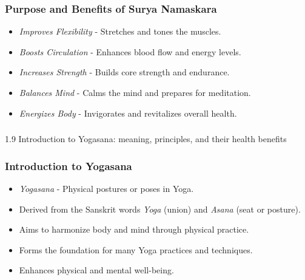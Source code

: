 \begin{frame}[fragile]\frametitle{Purpose and Benefits of Surya Namaskara}

      \begin{itemize}
		\item \textit{Improves Flexibility} - Stretches and tones the muscles.
		\item \textit{Boosts Circulation} - Enhances blood flow and energy levels.
		\item \textit{Increases Strength} - Builds core strength and endurance.
		\item \textit{Balances Mind} - Calms the mind and prepares for meditation.
		\item \textit{Energizes Body} - Invigorates and revitalizes overall health.
	  \end{itemize}

\end{frame}


\begin{frame}[fragile]\frametitle{}
\begin{center}
{\Large 1.9 Introduction to Yogasana: meaning, principles, and their health benefits}
\end{center}
\end{frame}

\begin{frame}[fragile]\frametitle{Introduction to Yogasana}

      \begin{itemize}
		\item \textit{Yogasana} - Physical postures or poses in Yoga.
		\item Derived from the Sanskrit words \textit{Yoga} (union) and \textit{Asana} (seat or posture).
		\item Aims to harmonize body and mind through physical practice.
		\item Forms the foundation for many Yoga practices and techniques.
		\item Enhances physical and mental well-being.
	  \end{itemize}

\end{frame}

